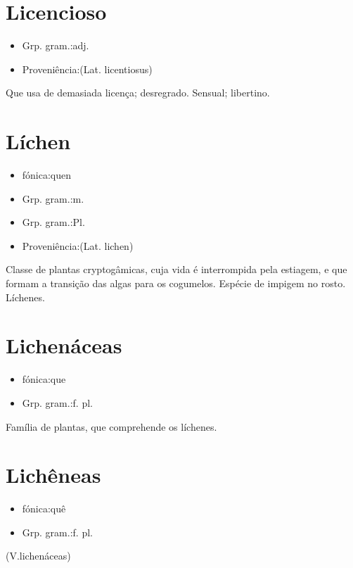 \section{Licencioso}
\begin{itemize}
\item {Grp. gram.:adj.}
\end{itemize}
\begin{itemize}
\item {Proveniência:(Lat. \textunderscore licentiosus\textunderscore )}
\end{itemize}
Que usa de demasiada licença; desregrado.
Sensual; libertino.
\section{Líchen}
\begin{itemize}
\item {fónica:quen}
\end{itemize}
\begin{itemize}
\item {Grp. gram.:m.}
\end{itemize}
\begin{itemize}
\item {Grp. gram.:Pl.}
\end{itemize}
\begin{itemize}
\item {Proveniência:(Lat. \textunderscore lichen\textunderscore )}
\end{itemize}
Classe de plantas cryptogâmicas, cuja vida é interrompida pela estiagem, e que formam a transição das algas para os cogumelos.
Espécie de impigem no rosto.
Líchenes.
\section{Lichenáceas}
\begin{itemize}
\item {fónica:que}
\end{itemize}
\begin{itemize}
\item {Grp. gram.:f. pl.}
\end{itemize}
Família de plantas, que comprehende os líchenes.
\section{Lichêneas}
\begin{itemize}
\item {fónica:quê}
\end{itemize}
\begin{itemize}
\item {Grp. gram.:f. pl.}
\end{itemize}
(V.lichenáceas)
